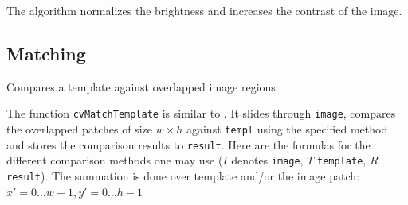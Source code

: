 The algorithm normalizes the brightness and increases the contrast of the image.

\subsection{Matching}

\label{MatchTemplate}

Compares a template against overlapped image regions.


\begin{description}
\end{description}

The function \texttt{cvMatchTemplate} is similar to
. It slides through \texttt{image}, compares the
overlapped patches of size $w \times h$ against \texttt{templ}
using the specified method and stores the comparison results to
\texttt{result}. Here are the formulas for the different comparison
methods one may use ($I$ denotes \texttt{image}, $T$ \texttt{template},
$R$ \texttt{result}). The summation is done over template and/or the
image patch: $x' = 0...w-1, y' = 0...h-1$


